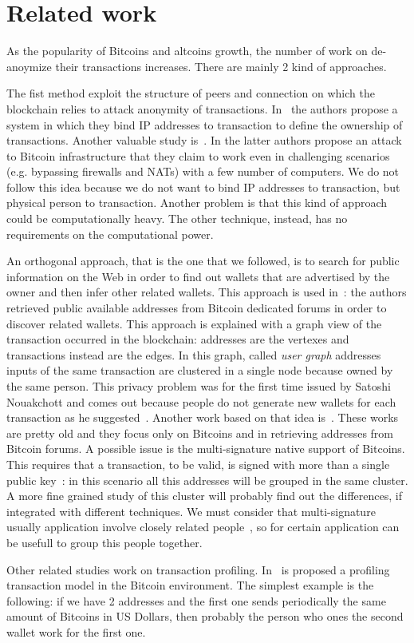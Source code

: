 \section{Related work}
As the popularity of Bitcoins and altcoins growth, the number of work on
de-anoymize their transactions increases. There are mainly 2 kind of approaches.

The fist method exploit the structure of peers and connection on which the
blockchain relies to attack anonymity of transactions. In~\cite{anonBitcoin}
the authors propose a system in which they bind IP addresses to transaction to
define the ownership of transactions. Another valuable study
is~\cite{deanonP2P}. In the latter authors propose an attack to Bitcoin
infrastructure that they claim to work even in challenging scenarios (e.g.
bypassing firewalls and NATs) with a few number of computers. We do not follow
this idea because we do not want to bind IP addresses to transaction, but
physical person to transaction. Another problem is that this kind of approach
could be computationally heavy. The other technique, instead, has no
requirements on the computational power.

An orthogonal approach, that is the one that we followed, is to search for
public information on the Web in order to find out wallets that are advertised
by the owner and then infer other related wallets. This approach is used
in~\cite{anonAnalysis}: the authors retrieved public available addresses from
Bitcoin dedicated forums in order to discover related wallets. This approach is
explained with a graph view of the transaction occurred in the blockchain:
addresses are the vertexes and transactions instead are the edges. In this
graph, called \textit{user graph} addresses inputs of the same transaction are
clustered in a single node because owned by the same person. This privacy
problem was for the first time issued by Satoshi Nouakchott and comes out
because people do not generate new wallets for each transaction as he
suggested~\cite{satoshi}. Another work based on that idea is~\cite{fistful}.
These works are pretty old and they focus only on Bitcoins and in retrieving
addresses from Bitcoin forums. A possible issue is the multi-signature native
support of Bitcoins. This requires that a transaction, to be valid, is signed
with more than a single public key~\cite{multisignature}: in this scenario all
this addresses will be grouped in the same cluster. A more fine grained study
of this cluster will probably find out the differences, if integrated with
different techniques. We must consider that multi-signature usually application
involve closely related people~\cite{multisignaturebitcoinwiki}, so for certain
application can be usefull to group this people together.

Other related studies work on transaction profiling. In~\cite{fullDiscl} is
proposed a profiling transaction model in the Bitcoin environment. The
simplest example is the following: if we have 2 addresses and the first one
sends periodically the same amount of Bitcoins in US Dollars, then probably
the person who ones the second wallet work for the first one.